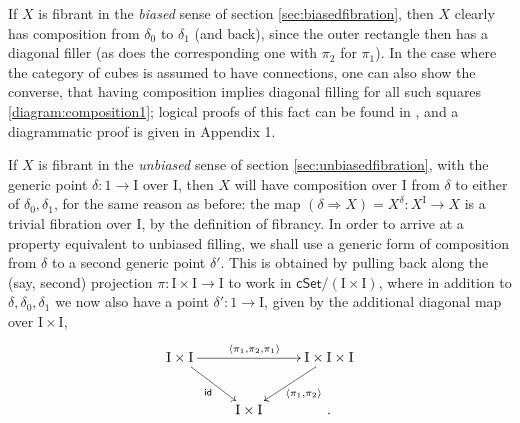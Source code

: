 \documentclass[12pt]{article}
\newcommand{\cSet}{\ensuremath{\mathsf{cSet}}}
\newcommand{\ra}{\ensuremath{\rightarrow}}
\newcommand{\I}{\ensuremath{\mathrm{I}}}
\theoremstyle{remark}
\theoremstyle{definition}
\begin{document}
If $X$ is fibrant in the \emph{biased} sense of section \ref{sec:biasedfibration}, then $X$ clearly has composition from $\delta_0$ to $\delta_1$ (and back), since the outer rectangle then has a diagonal filler (as does the corresponding one with $\pi_2$ for $\pi_1$).   In the case where the category of cubes is assumed to have connections, one can also show the converse, that having composition implies diagonal filling for all such squares \eqref{diagram:composition1}; logical proofs of this fact can be found in \cite{CCHM,OP}, and a diagrammatic proof is given in Appendix 1.

If $X$ is fibrant in the \emph{unbiased} sense of section \ref{sec:unbiasedfibration}, with the generic point $\delta : 1\ra \I$ over $\I$, then $X$  will have composition over $\I$ from $\delta$ to either of $\delta_0, \delta_1$, for the same reason as before: the map $(\delta\!\Rightarrow\!X) = X^\delta : X^\I \ra X$ is a trivial fibration over $\I$, by the definition of fibrancy. In order to arrive at a property equivalent to unbiased filling, we shall use a generic form of composition from $\delta$ to a second generic point $\delta'$.  This is obtained by pulling back along the (say, second) projection $\pi : \I\times\I \ra \I$ to work in $\cSet/(\I\times\I)$, where in addition to $\delta, \delta_0, \delta_1$ we now also have a point $\delta' : 1 \ra \I$, given by the additional diagonal map over $\I\times \I$,
\begin{equation}\label{diagram:deltaprime}
\xymatrix{
\I\times\I  \ar[rd]_{\mathsf{id}} \ar[rr]^{\langle \pi_1, \pi_2, \pi_1\rangle}  && \I\times\I\times\I \ar[ld]^{\langle \pi_1, \pi_2\rangle} \\
&  \I\times\I &.
}
\end{equation}
\end{document}
